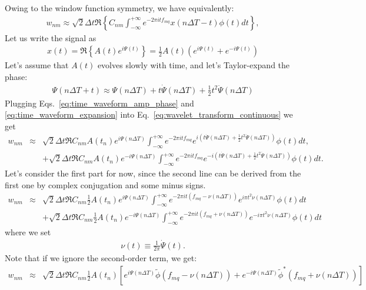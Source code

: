 \documentclass{article}
\begin{document}
Owing to the window function symmetry, we have equivalently:
\begin{eqnarray}
\label{eq:wavelet_transform_continuous_sym}
    w_{n m} \approx \sqrt{2} \Delta t \Re \left\{C_{n m} \int_{-\infty}^{+\infty} e^{-2 \pi i t f_{mq}} x(n \Delta T - t) \phi(t) dt\right\},
\end{eqnarray}
Let us write the signal as
\begin{eqnarray}
\label{eq:time_waveform_amp_phase}
    x(t) = \Re\left\{A(t) e^{i \Psi(t)} \right\} = \frac{1}{2}A(t)\left(e^{i \Psi(t)} + e^{-i \Psi(t)}\right)
\end{eqnarray}
Let's assume that $A(t)$ evolves slowly with time, and let's Taylor-expand the phase:
\begin{eqnarray}
\label{eq:time_waveform_expansion}
    \Psi(n\Delta T + t) \approx \Psi(n\Delta T) + t \dot{\Psi}(n\Delta T) + \frac{1}{2} t^2 \ddot{\Psi}(n\Delta T)
\end{eqnarray}
Plugging Eqs.~\eqref{eq:time_waveform_amp_phase} and \eqref{eq:time_waveform_expansion} into Eq.~\eqref{eq:wavelet_transform_continuous} we get
\begin{eqnarray}
\label{eq:wavelet_transform_continuous_expansion}
    w_{n m} & \approx & \sqrt{2} \Delta t \Re C_{n m} A(t_n) e^{i\Psi(n\Delta T)} \int_{-\infty}^{+\infty} e^{-2 \pi i t f_{mq}} e^{i\left(t \dot{\Psi}(n\Delta T) + \frac{1}{2} t^2 \ddot{\Psi}(n\Delta T)\right)}\phi(t) dt, \nonumber \\
    && + \sqrt{2} \Delta t \Re C_{n m} A(t_n) e^{-i\Psi(n\Delta T)} \int_{-\infty}^{+\infty} e^{-2 \pi i t f_{mq}} e^{-i\left(t \dot{\Psi}(n\Delta T) + \frac{1}{2} t^2 \ddot{\Psi}(n\Delta T)\right)}\phi(t) dt.
\end{eqnarray}
Let's consider the first part for now, since the second line can be derived from the first one by complex conjugation and some minus signs.
\begin{eqnarray}
    w_{n m} & \approx & \sqrt{2} \Delta t \Re C_{n m} \frac{1}{2}A(t_n) e^{i\Psi(n\Delta T)} \int_{-\infty}^{+\infty} e^{-2 \pi i t\left( f_{mq} - \nu(n\Delta T)\right)} e^{i \pi  t^2 \dot{\nu}(n\Delta T)}\phi(t) dt \nonumber \\
    && + \sqrt{2} \Delta t \Re C_{n m} \frac{1}{2} A(t_n) e^{-i\Psi(n\Delta T)} \int_{-\infty}^{+\infty} e^{-2 \pi i t\left( f_{mq} + \nu(n\Delta T)\right)} e^{-i \pi  t^2 \dot{\nu}(n\Delta T)}\phi(t) dt
\end{eqnarray}
where we set 
\begin{eqnarray}
    \nu(t) \equiv \frac{1}{2 \pi} \dot{\Psi}(t).
\end{eqnarray}
Note that if we ignore the second-order term, we get:
\begin{eqnarray}
\label{eq:wavelet_time_approx_first_order}
    w_{n m} & \approx & \sqrt{2} \Delta t \Re C_{n m} \frac{1}{2} A(t_n) \left[ e^{i\Psi(n\Delta T)} \tilde{\phi}\left( f_{mq} - \nu(n\Delta T) \right) + e^{-i\Psi(n\Delta T)} \tilde{\phi}^{\ast}\left( f_{mq} + \nu(n\Delta T) \right)\right]
\end{eqnarray}
\end{document}
